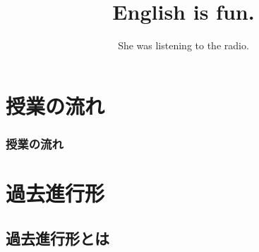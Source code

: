 \documentclass[aspectratio=169,xcolor={dvipsnames,table}]{beamer}
\title{English is fun.}
\subtitle{She was listening to the radio.}
\author{}
\institute[]{}
\date[]
\begin{document}
\begin{frame}[plain]
  \titlepage
\end{frame}


\section*{授業の流れ}
\begin{frame}[plain]
  \frametitle{授業の流れ}
  \tableofcontents
\end{frame}

\section{過去進行形}

\subsection{過去進行形とは}
\end{document}

